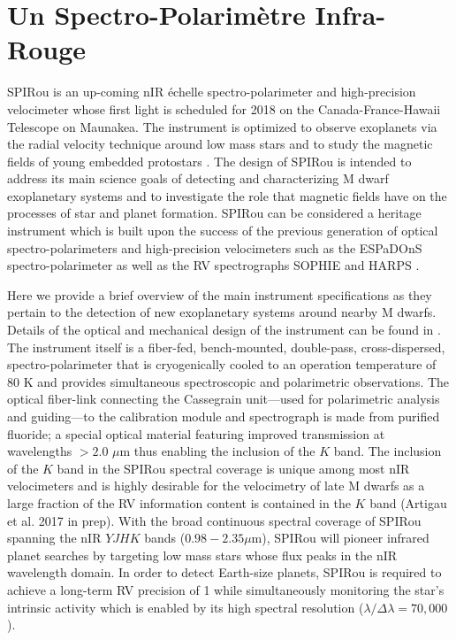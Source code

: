 \section{Un Spectro-Polarim\`{e}tre Infra-Rouge} \label{BSsect:spirou}
SPIRou is an up-coming nIR \'echelle spectro-polarimeter and high-precision velocimeter whose first
light is scheduled for 2018 on the Canada-France-Hawaii Telescope on Maunakea.
The instrument is optimized to observe exoplanets via the radial
velocity technique around low mass stars and to study the magnetic fields of young embedded protostars
\citep{delfosse13}. 
The design of SPIRou is intended to address its main science goals of detecting and characterizing
M dwarf exoplanetary systems and to investigate the role that magnetic fields have on the processes of
star and planet formation. SPIRou can be considered a heritage instrument which is built upon the success
of the previous generation of optical spectro-polarimeters and high-precision velocimeters such as the ESPaDOnS
spectro-polarimeter \citep{donati06} as well as the RV spectrographs SOPHIE \citep{bouchy06}
and HARPS \citep{mayor03}.

Here we provide a brief overview of the main instrument specifications as they pertain to the detection of
new exoplanetary systems around nearby M dwarfs.  Details of the optical and mechanical design
of the instrument can be found in \cite{artigau14}. 
The instrument itself is a fiber-fed, bench-mounted, double-pass, cross-dispersed, spectro-polarimeter
that is cryogenically cooled to an operation temperature of 80 K and provides simultaneous spectroscopic and
polarimetric observations. The optical fiber-link connecting the
Cassegrain unit---used for polarimetric analysis and guiding---to the calibration module and spectrograph is made
from purified fluoride; a special optical material featuring improved transmission at wavelengths $>2.0$ $\mu$m thus
enabling the inclusion of the $K$ band. The inclusion of the $K$ band in the SPIRou spectral coverage
is unique among most nIR velocimeters and is highly desirable for the velocimetry of late M dwarfs as
a large fraction of the RV information content is contained in the $K$ band (Artigau et al. 2017 in prep).
With the broad continuous spectral coverage of SPIRou spanning the nIR $YJHK$ bands
($0.98-2.35 \mu$m), SPIRou will pioneer infrared planet searches by targeting low mass stars whose flux
peaks in the nIR wavelength domain. In order to detect Earth-size planets, SPIRou is required to achieve a
long-term RV precision of 1 \mps{} while simultaneously monitoring the star's intrinsic activity which is enabled
by its high spectral resolution ($\lambda/ \Delta \lambda = 70,000$).


